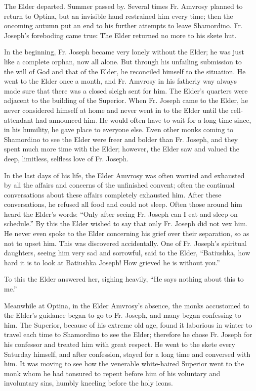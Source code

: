 The Elder departed. Summer passed by. Several times Fr. Amvrosy planned to return to Optina, but an invisible hand restrained him every time; then the oncoming autumn put an end to his further attempts to leave Shamordino. Fr. Joseph's foreboding came true: The Elder returned no more to his skete hut.

In the beginning, Fr. Joseph became very lonely without the Elder; he was just like a complete orphan, now all alone. But through his unfailing submission to the will of God and that of the Elder, he reconciled himself to the situation. He went to the Elder once a month, and Fr. Amvrosy in his fatherly way always made sure that there was a closed sleigh sent for him. The Elder's quarters were adjacent to the building of the Superior. When Fr. Joseph came to the Elder, he never considered himself at home and never went in to the Elder until the cell-attendant had announced him. He would often have to wait for a long time since, in his humility, he gave place to everyone else. Even other monks coming to Shamordino to see the Elder were freer and bolder than Fr. Joseph, and they spent much more time with the Elder; however, the Elder saw and valued the deep, limitless, selfless love of Fr. Joseph.

In the last days of his life, the Elder Amvrosy was often worried and exhausted by all the affairs and concerns of the unfinished convent; often the continual conversations about these affairs completely exhausted him. After these conversations, he refused all food and could not sleep. Often those around him heard the Elder's words: ``Only after seeing Fr. Joseph can I eat and sleep on schedule.'' By this the Elder wished to say that only Fr. Joseph did not vex him. He never even spoke to the Elder concerning his grief over their separation, so as not to upset him. This was discovered accidentally. One of Fr. Joseph's spiritual daughters, seeing him very sad and sorrowful, said to the Elder, ``Batiushka, how hard it is to look at Batiushka Joseph! How grieved he is without you.''

To this the Elder answered her, sighing heavily, ``He says nothing about this to me.''

Meanwhile at Optina, in the Elder Amvrosy's absence, the monks accustomed to the Elder's guidance began to go to Fr. Joseph, and many began confessing to him. The Superior, because of his extreme old age, found it laborious in winter to travel each time to Shamordino to see the Elder; therefore he chose Fr. Joseph for his confessor and treated him with great respect. He went to the skete every Saturday himself, and after confession, stayed for a long time and conversed with him. It was moving to see how the venerable white-haired Superior went to the monk whom he had tonsured to repent before him of his voluntary and involuntary sins, humbly kneeling before the holy icons.

